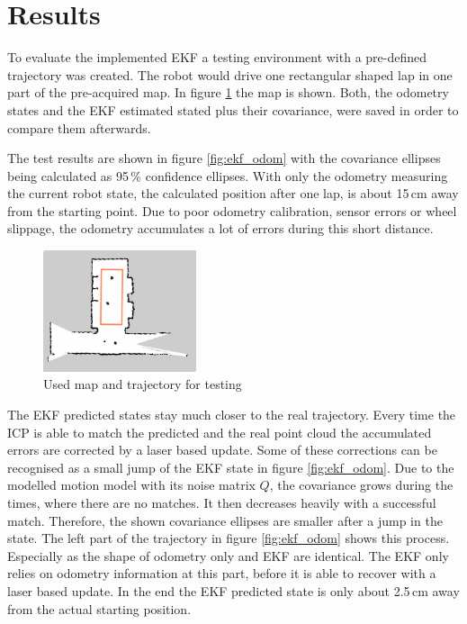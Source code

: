 \section{Results}
\label{sec:Results}


To evaluate the implemented EKF a testing environment with a pre-defined trajectory was created. The robot would drive one rectangular shaped lap in one part of the pre-acquired map. In figure \ref{fig:test_map} the map is shown. 
Both, the odometry states and the EKF estimated stated plus their covariance, were saved in order to compare them afterwards.

The test results are shown in figure \ref{fig:ekf_odom} with the covariance ellipses being calculated as 95\,\% confidence ellipses. 
With only the odometry measuring the current robot state, the calculated position after one lap, is about 15\,cm away from the starting point. Due to poor odometry calibration, sensor errors or wheel slippage, the odometry accumulates a lot of errors during this short distance.
\begin{figure}[h]
\centering
\includegraphics[width=0.4\textwidth]{figures/test_map}
      \caption{Used map and trajectory for testing}
      \label{fig:test_map}
\end{figure}

The EKF predicted states stay much closer to the real trajectory. Every time the ICP is able to match the predicted and the real point cloud the accumulated errors are corrected by a laser based update. Some of these corrections can be recognised as a small jump of the EKF state in figure \ref{fig:ekf_odom}. Due to the modelled motion model with its noise matrix $Q$, the covariance grows during the times, where there are no matches. It then decreases heavily with a successful match. Therefore, the shown covariance ellipses are smaller after a jump in the state. The left part of the trajectory in  figure \ref{fig:ekf_odom} shows this process. Especially as the shape of odometry only and EKF are identical. The EKF only relies on odometry information at this part, before it is able to recover with a laser based update. In the end the EKF predicted state is only about 2.5\,cm away from the actual starting position. 


